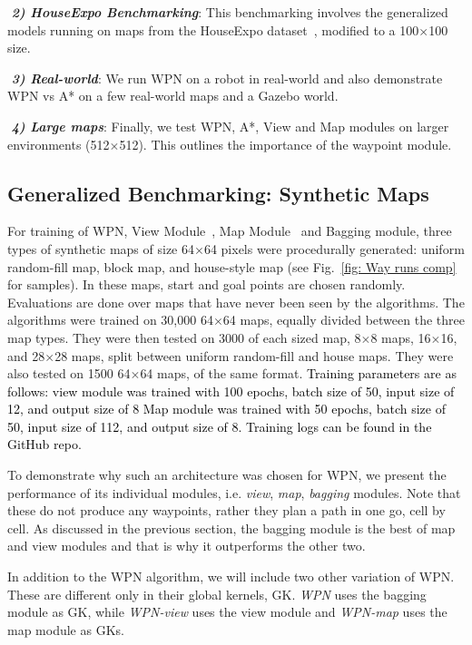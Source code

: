 \documentclass[journal, twocolumn]{IEEEtran}
\begin{document}
\noindent\emph{\bf\,\,2) HouseExpo Benchmarking}: This benchmarking involves the generalized models running on maps from the HouseExpo dataset~\cite{houseexpo}, modified to a 100$\times$100 size. \par

\noindent\emph{\bf\,\,3) Real-world}: We run WPN on a robot in real-world and also demonstrate WPN vs A* on a few real-world maps and a Gazebo world. 


\noindent\emph{\bf\,\,4) Large maps}: Finally, we test WPN, A*, View and Map modules on larger environments (512$\times$512). This outlines the importance of the waypoint module.



\subsection{Generalized Benchmarking: Synthetic Maps}
\label{sec:Generalized}
For training of WPN, View Module~\cite{nicola2018lstm}, Map Module~\cite{inoue2019robot} and Bagging module, three types of synthetic maps of size 64$\times$64 pixels were procedurally generated: uniform random-fill map, block map, and house-style map (see Fig.~\ref{fig: Way runs comp} for samples). In these maps, start and goal points are chosen randomly. Evaluations are done over maps that have never been seen by the algorithms. The algorithms were trained on 30,000 64$\times$64 maps, equally divided between the three map types. They were then tested on 3000 of each sized map, 8$\times$8 maps, 16$\times$16, and 28$\times$28  maps, split between uniform random-fill and house maps. They were also tested on 1500 64$\times$64 maps, of the same format. \textcolor{black}{Training parameters are as follows: view module was trained with 100 epochs, batch size of 50, input size of 12, and output size of 8 Map module was trained with 50 epochs, batch size of 50, input size of 112, and output size of 8. Training logs can be found in the GitHub repo.}

To demonstrate why such an architecture was chosen for WPN, we present the performance of its individual modules, i.e. \emph{view}, \emph{map}, \emph{bagging} modules. Note that these do not produce any waypoints, rather they plan a path in one go, cell by cell. As discussed in the previous section, the bagging module is the best of map and view modules and that is why it outperforms the other two.

In addition to the WPN algorithm, we will include two other variation of WPN. These are different only in their global kernels, GK. \emph{WPN} uses the bagging module as GK, while \emph{WPN-view} uses the view module and \emph{WPN-map} uses the map module as GKs.
\end{document}
